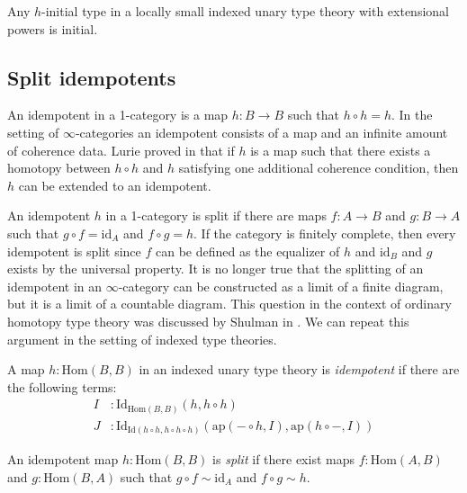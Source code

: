 \documentclass[reqno]{amsart}
\theoremstyle{definition}
\theoremstyle{remark}
\newcommand{\fs}[1]{\mathrm{#1}}
\newcommand{\Hom}{\fs{Hom}}
\newcommand{\Id}{\fs{Id}}
\newcommand{\id}{\fs{id}}
\newcommand{\pmap}{\fs{ap}}
\numberwithin{figure}{section}
\begin{document}
\begin{cor}
Any $h$-initial type in a locally small indexed unary type theory with extensional powers is initial.
\end{cor}

\subsection{Split idempotents}

An idempotent in a 1-category is a map $h : B \to B$ such that $h \circ h = h$.
In the setting of $\infty$-categories an idempotent consists of a map and an infinite amount of coherence data.
Lurie proved in \cite[Lemma~7.3.5.14]{lurie-algebra} that if $h$ is a map such that there exists a homotopy between $h \circ h$ and $h$ satisfying one additional coherence condition, then $h$ can be extended to an idempotent.

An idempotent $h$ in a 1-category is split if there are maps $f : A \to B$ and $g : B \to A$ such that $g \circ f = \id_A$ and $f \circ g = h$.
If the category is finitely complete, then every idempotent is split since $f$ can be defined as the equalizer of $h$ and $\id_B$ and $g$ exists by the universal property.
It is no longer true that the splitting of an idempotent in an $\infty$-category can be constructed as a limit of a finite diagram, but it is a limit of a countable diagram.
This question in the context of ordinary homotopy type theory was discussed by Shulman in \cite{split-idemp}.
We can repeat this argument in the setting of indexed type theories.

\begin{defn}
A map $h : \Hom(B,B)$ in an indexed unary type theory is \emph{idempotent} if there are the following terms:
\begin{align*}
I & : \Id_{\Hom(B,B)}(h, h \circ h) \\
J & : \Id_{\Id(h \circ h, h \circ h \circ h)}(\pmap(- \circ h, I), \pmap(h \circ -, I))
\end{align*}
\end{defn}

\begin{defn}
An idempotent map $h : \Hom(B,B)$ is \emph{split} if there exist maps $f : \Hom(A,B)$ and $g : \Hom(B,A)$ such that $g \circ f \sim \id_A$ and $f \circ g \sim h$.
\end{defn}
\end{document}
